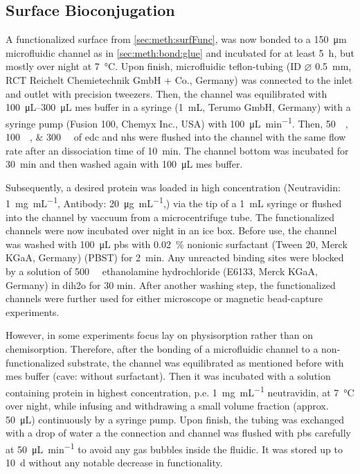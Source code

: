\subsection{Surface Bioconjugation}
\label{sec:meth:surfBio}
A functionalized surface from \ref{sec:meth:surfFunc}, was now bonded to a \SI{150}{\micro\meter} microfluidic channel as in \ref{sec:meth:bond:glue} and incubated for at least \SI{5}{\hour}, but mostly over night at \SI{7}{\degreeCelsius}. Upon finish, microfluidic teflon-tubing (ID $\varnothing$ \SI{0.5}{\milli\meter}, RCT Reichelt Chemietechnik GmbH + Co., Germany)  was connected to the inlet and outlet with precision tweezers. Then, the channel was equilibrated with \SIrange{100}{300}{\micro\liter} \gls{mes} buffer in a syringe (\SI{1}{\milli\liter}, Terumo GmbH, Germany) with a syringe pump (Fusion 100, Chemyx Inc., USA) with \SI{100}{\micro\liter\per\minute}. Then, \SIlist{50;100;300}{\milli\molar} of \gls{edc} and \gls{nhs} were flushed into the channel with the same flow rate after an dissociation time of \SI{10}{\minute}. The channel bottom was incubated for \SI{30}{\minute} and then washed again with \SI{100}{\micro\liter} \gls{mes} buffer. 

Subsequently, a desired protein was loaded in high concentration (Neutravidin: \SI{1}{\milli\gram\per\milli\liter}, Antibody: \SI{20}{\micro\gram\per\milli\liter},) via the tip of a \SI{1}{\milli\liter} syringe or flushed into the channel by vaccuum from a microcentrifuge tube. The functionalized channels were now incubated over night in an ice box. Before use, the channel was washed with \SI{100}{\micro\liter} \gls{pbs} with \SI{0.02}{\percent} nonionic surfactant (Tween 20, Merck KGaA, Germany) (PBST) for \SI{2}{\minute}. Any unreacted binding sites were blocked by a solution of \SI{500}{\milli\molar} ethanolamine hydrochloride (E6133, Merck KGaA, Germany) in \gls{dih2o} for 30 min. After another washing step, the functionalized channels were further used for either microscope or magnetic bead-capture experiments.

However, in some experiments focus lay on physisorption rather than on chemisorption. Therefore, after the bonding of a microfluidic channel to a non-functionalized substrate, the channel was equilibrated as mentioned before with \gls{mes} buffer (cave: without surfactant). Then it was incubated with a solution containing protein in highest concentration, p.e. \SI{1}{\milli\gram\per\milli\liter} neutravidin, at \SI{7}{\degreeCelsius} over night, while infusing and withdrawing a small volume fraction (approx. \SI{50}{\micro\liter}) continuously by a syringe pump. Upon finish, the tubing was exchanged with a drop of water a the connection and channel was flushed with \gls{pbs} carefully at \SI{50}{\micro\liter\per\minute} to avoid any gas bubbles inside the fluidic. It was stored up to \SI{10}{\day} without any notable decrease in functionality.
